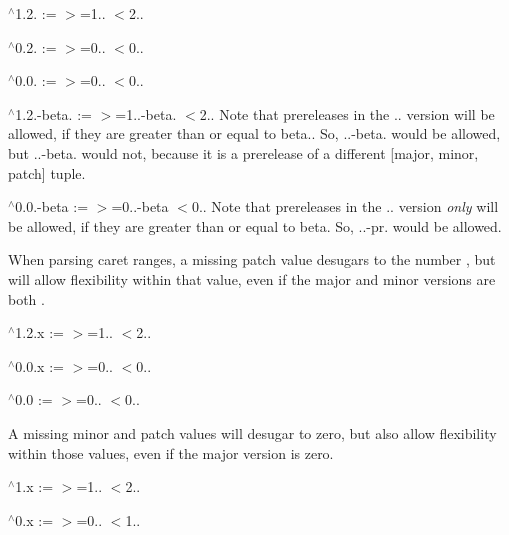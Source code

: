 \begin{DoxyItemize}
\item {\ttfamily $^\wedge$1.2.} \+:= {\ttfamily $>$=1.. $<$2..}
\item {\ttfamily $^\wedge$0.2.} \+:= {\ttfamily $>$=0.. $<$0..}
\item {\ttfamily $^\wedge$0.0.} \+:= {\ttfamily $>$=0.. $<$0..}
\item {\ttfamily $^\wedge$1.2.-\/beta.} \+:= {\ttfamily $>$=1..-\/beta. $<$2..} Note that prereleases in the {..} version will be allowed, if they are greater than or equal to {\ttfamily beta.}. So, {..-\/beta.} would be allowed, but {..-\/beta.} would not, because it is a prerelease of a different {\ttfamily \mbox{[}major, minor, patch\mbox{]}} tuple.
\item {\ttfamily $^\wedge$0.0.-\/beta} \+:= {\ttfamily $>$=0..-\/beta $<$0..} Note that prereleases in the {..} version {\itshape only} will be allowed, if they are greater than or equal to {\ttfamily beta}. So, {..-\/pr.} would be allowed.
\end{DoxyItemize}

When parsing caret ranges, a missing {\ttfamily patch} value desugars to the number {}, but will allow flexibility within that value, even if the major and minor versions are both {}.


\begin{DoxyItemize}
\item {\ttfamily $^\wedge$1.2.\+x} \+:= {\ttfamily $>$=1.. $<$2..}
\item {\ttfamily $^\wedge$0.0.\+x} \+:= {\ttfamily $>$=0.. $<$0..}
\item {\ttfamily $^\wedge$0.0} \+:= {\ttfamily $>$=0.. $<$0..}
\end{DoxyItemize}

A missing {\ttfamily minor} and {\ttfamily patch} values will desugar to zero, but also allow flexibility within those values, even if the major version is zero.


\begin{DoxyItemize}
\item {\ttfamily $^\wedge$1.x} \+:= {\ttfamily $>$=1.. $<$2..}
\item {\ttfamily $^\wedge$0.x} \+:= {\ttfamily $>$=0.. $<$1..}
\end{DoxyItemize}


